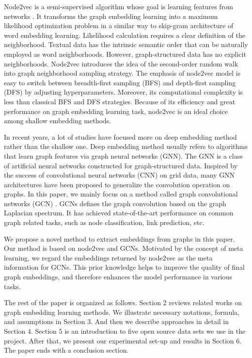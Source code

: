 \documentclass[sigconf]{acmart}
\begin{document}
Node2vec is a semi-supervised algorithm whose goal is learning features from networks \cite{node2vec}. It transforms the graph embedding learning into a maximum likelihood optimization problem in a similar way to skip-gram architecture of word embedding learning. Likelihood calculation requires a clear definition of the neighborhood. Textual data has the intrinsic semantic order that can be naturally employed as word neighborhoods. However, graph-structured data has no explicit neighborhoods. Node2vec introduces the idea of the second-order random walk into graph neighborhood sampling strategy. The emphasis of node2vec model is easy to switch between breadth-first sampling (BFS) and depth-first sampling (DFS) by adjusting hyperparameters. Moreover, its computational complexity is less than classical BFS and DFS strategies. Because of its efficiency and great performance on graph embedding learning task, node2vec is an ideal choice among shallow embedding methods.\par
In recent years, a lot of studies have focused more on deep embedding method rather than the shallow one. Deep embedding method usually refers to algorithms that learn graph features via graph neural networks (GNN). The GNN is a class of artificial neural networks constructed for graph-structured data. Inspired by the success of convolutional neural networks (CNN) on grid data, many GNN architectures have been proposed to generalize the convolution operation on graphs. In this paper, we mainly focus on a method called graph convolutional networks (GCN) \cite{gcn}. GCNs defines the graph convolution based on the graph Laplacian spectrum. It has achieved state-of-the-art performance on common graph related tasks, such as node classification, link prediction, etc.\par
We propose a novel method to extract embeddings from graphs in this paper. Our method is based on node2vec and GCNs. Motivated by the concept of meta learning, we regard the embeddings returned by node2vec as the meta information for GCNs. This prior knowledge helps to improve the quality of final graph embeddings, and therefore enhances the model performance in various tasks.\par
The rest of the paper is organized as follows. Section 2 reviews related works on graph embedding learning methods. We illustrate necessary notations, formula, and assumptions in Section 3. And then we describe approaches in detail in Section 4. Section 5 is an introduction to five open source data sets we use in the project. After that, we present our experimental set-up and results in Section 6. The paper ends with a conclusion section.  
\end{document}
